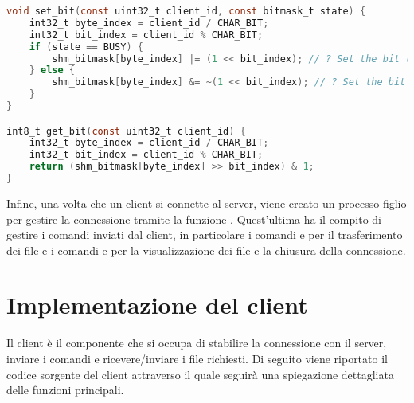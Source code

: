 \begin{lstlisting}[caption={\lstinlinebg{src/spqr_server.c}},language=C,keywords={const, int8_t, bitmask_t, CHAR_BIT, fopen, exit, printf, if, else, return, stdin, void,  set_seconds_timeout, sockfd, MAX_CLIENTS, SIGQUIT, SIGINT, int32_t, uint32_t, INVALID_PID, SIGTERM, EXIT_SUCCESS, BUSY}]
void set_bit(const uint32_t client_id, const bitmask_t state) {
    int32_t byte_index = client_id / CHAR_BIT;
    int32_t bit_index = client_id % CHAR_BIT;
    if (state == BUSY) {
        shm_bitmask[byte_index] |= (1 << bit_index); // ? Set the bit to 1
    } else {
        shm_bitmask[byte_index] &= ~(1 << bit_index); // ? Set the bit to 0
    }
}

int8_t get_bit(const uint32_t client_id) {
    int32_t byte_index = client_id / CHAR_BIT;
    int32_t bit_index = client_id % CHAR_BIT;
    return (shm_bitmask[byte_index] >> bit_index) & 1;
}
\end{lstlisting}

Infine, una volta che un client si connette al server, viene creato un processo figlio per gestire la connessione tramite la funzione .
Quest'ultima ha il compito di gestire i comandi inviati dal client, in particolare i comandi  e  per il trasferimento dei file e i comandi  e  per la visualizzazione dei file e la chiusura della connessione.

\section{Implementazione del client}
Il client è il componente che si occupa di stabilire la connessione con il server, inviare i comandi e ricevere/inviare i file richiesti.
Di seguito viene riportato il codice sorgente del client attraverso il quale seguirà una spiegazione dettagliata delle funzioni principali.

